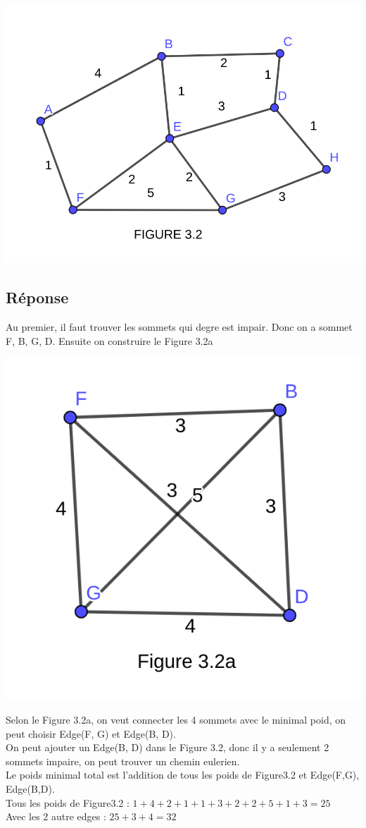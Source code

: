 \documentclass[12pt]{fphw}
\begin{document}
\begin{center}
	\includegraphics[width=0.5\columnwidth]{Figure3.2.png} %
\end{center}

\subsection*{Réponse}Au premier, il faut trouver les sommets qui degre est impair. Donc on a sommet F, B, G, D. Ensuite on construire le Figure 3.2a\\

\begin{center}
	\includegraphics[width=0.5\columnwidth]{Figure3.2a.png} %
\end{center}

Selon le Figure 3.2a, on veut connecter les 4 sommets avec le minimal poid, on peut choisir Edge(F, G) et Edge(B, D).\\

On peut ajouter un Edge(B, D) dans le Figure 3.2, donc il y a seulement 2 sommets impaire, on peut trouver un chemin eulerien.\\

Le poids minimal total est l'addition de tous les poids de Figure3.2 et Edge(F,G), Edge(B,D).\\

Tous les poids de Figure3.2 : \(1+4+2+1+1+3+2+2+5+1+3 = 25\)\\
Avec les 2 autre edges : \(25 + 3 + 4 = 32\)\\
\end{document}
